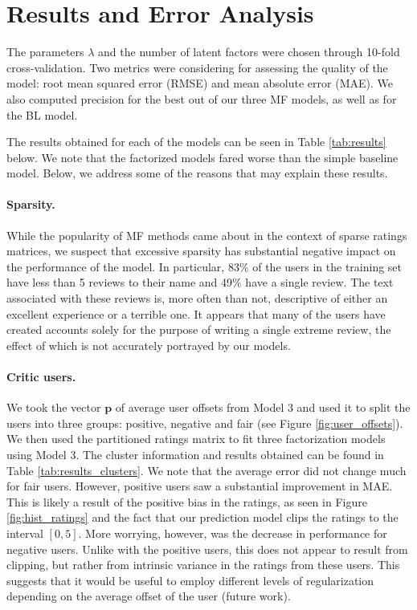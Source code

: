 \documentclass[12pt]{article}
\newcommand{\mbf}[1]{\mathbf{#1}}
\begin{document}
\section{Results and Error Analysis}\label{errors}
The parameters $\lambda$ and the number of latent factors were chosen through 10-fold cross-validation. Two metrics were considering for assessing the quality of the model: root mean squared error (RMSE) and mean absolute error (MAE). We also computed precision for the best out of our three MF models, as well as for the BL model.

The results obtained for each of the models can be seen in Table \ref{tab:results} below. We note that the factorized models fared worse than the simple baseline model. Below, we address some of the reasons that may explain these results.

\paragraph{Sparsity.} While the popularity of MF methods came about in the context of sparse ratings matrices, we suspect that excessive sparsity has substantial negative impact on the performance of the model. In particular, 83\% of the users in the training set have less than 5 reviews to their name and 49\% have a single review. The text associated with these reviews is, more often than not, descriptive of either an excellent experience or a terrible one. It appears that many of the users have created accounts solely for the purpose of writing a single extreme review, the effect of which is not accurately portrayed by our models.

\paragraph{Critic users.} We took the vector $\mbf p$ of average user offsets from Model 3 and used it to split the users into three groups: positive, negative and fair (see Figure \ref{fig:user_offsets}). We then used the partitioned ratings matrix to fit three factorization models using Model 3. The cluster information and results obtained can be found in Table \ref{tab:results_clusters}. We note that the average error did not change much for fair users. However, positive users saw a substantial improvement in MAE. This is likely a result of the positive bias in the ratings, as seen in Figure \ref{fig:hist_ratings} and the fact that our prediction model clips the ratings to the interval $[0,5]$. More worrying, however, was the decrease in performance for negative users. Unlike with the positive users, this does not appear to result from clipping, but rather from intrinsic variance in the ratings from these users. This suggests that it would be useful to employ different levels of regularization depending on the average offset of the user (future work).
\end{document}
